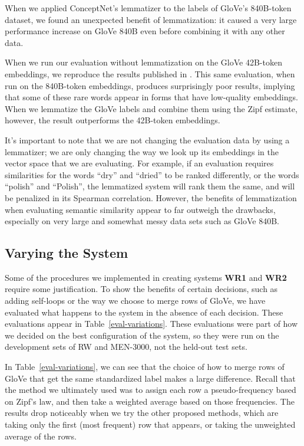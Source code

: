 \documentclass[11pt,letterpaper]{article}
\begin{document}
When we applied ConceptNet's lemmatizer to the labels of GloVe's 840B-token
dataset, we found an unexpected benefit of lemmatization: it caused a very
large performance increase on GloVe 840B even before combining it with any
other data.

When we run our evaluation without lemmatization on the GloVe 42B-token
embeddings, we reproduce the results published in \cite{pennington2014glove}.
This same evaluation, when run on the 840B-token embeddings, produces
surprisingly poor results, implying that some of these rare words appear in
forms that have low-quality embeddings. When we lemmatize the GloVe labels and
combine them using the Zipf estimate, however, the result outperforms the
42B-token embeddings.

It's important to note that we are not changing the evaluation data by using
a lemmatizer; we are only changing the way we look up its embeddings in the
vector space that we are evaluating. For example, if an evaluation requires
similarities for the words ``dry'' and ``dried'' to be ranked differently, or
the words ``polish'' and ``Polish'', the lemmatized system will rank them the
same, and will be penalized in its Spearman correlation.
However, the benefits of lemmatization when evaluating semantic similarity
appear to far outweigh the drawbacks, especially on very large and somewhat
messy data sets such as GloVe 840B.

\subsection{Varying the System}

Some of the procedures we implemented in creating systems {\bf WR1} and
{\bf WR2} require some justification. To show the benefits of certain decisions,
such as adding self-loops or the way we choose to merge rows of GloVe, we have
evaluated what happens to the system in the absence of each decision. These
evaluations appear in Table~\ref{eval-variations}. These evaluations were
part of how we decided on the best configuration of the system, so they were
run on the development sets of RW and MEN-3000, not the held-out test sets.

In Table~\ref{eval-variations}, we can see that the choice of how to merge rows
of GloVe that get the same standardized label makes a large difference.  Recall
that the method we ultimately used was to assign each row a pseudo-frequency
based on Zipf's law, and then take a weighted average based on those
frequencies.  The results drop noticeably when we try the other proposed
methods, which are taking only the first (most frequent) row that appears, or
taking the unweighted average of the rows.
\end{document}
